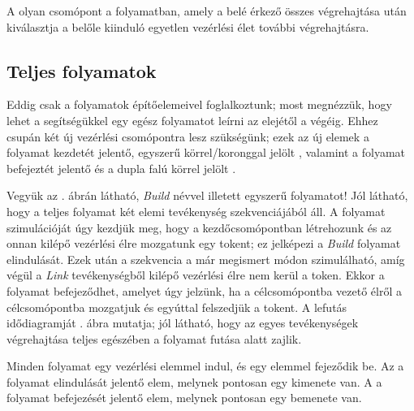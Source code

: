 \begin{definicio}
	A  olyan csomópont a folyamatban, amely a belé érkező összes  végrehajtása után kiválasztja a belőle kiinduló egyetlen vezérlési élet további végrehajtásra. 
\end{definicio}


\subsection{Teljes folyamatok}
Eddig csak a folyamatok építőelemeivel foglalkoztunk; most megnézzük, hogy lehet a segítségükkel egy egész folyamatot leírni az elejétől a végéig. Ehhez csupán két új vezérlési csomópontra lesz szükségünk; ezek az új elemek a folyamat kezdetét jelentő, egyszerű körrel/koronggal jelölt , valamint a folyamat befejeztét jelentő és a dupla falú körrel jelölt .

\begin{pelda}
Vegyük az . ábrán látható, \emph{Build} névvel illetett egyszerű folyamatot! Jól látható, hogy a teljes folyamat két elemi tevékenység szekvenciájából áll. A folyamat szimulációját úgy kezdjük meg, hogy a kezdőcsomópontban létrehozunk és az onnan kilépő vezérlési élre mozgatunk egy tokent; ez jelképezi a \emph{Build} folyamat elindulását. Ezek után a szekvencia a már megismert módon szimulálható, amíg végül a \emph{Link} tevékenységből kilépő vezérlési élre nem kerül a token. Ekkor a folyamat befejeződhet, amelyet úgy jelzünk, ha a célcsomópontba vezető élről a célcsomópontba mozgatjuk és egyúttal felszedjük a tokent. A lefutás idődiagramját . ábra mutatja; jól látható, hogy az egyes tevékenységek végrehajtása teljes egészében a folyamat futása alatt zajlik.
\end{pelda}


\begin{definicio}
	Minden folyamat egy  vezérlési elemmel indul, és egy  elemmel fejeződik be.
Az  a folyamat elindulását jelentő elem, melynek pontosan egy kimenete van. 
A  a folyamat befejezését jelentő elem, melynek pontosan egy bemenete van. 
\end{definicio}


